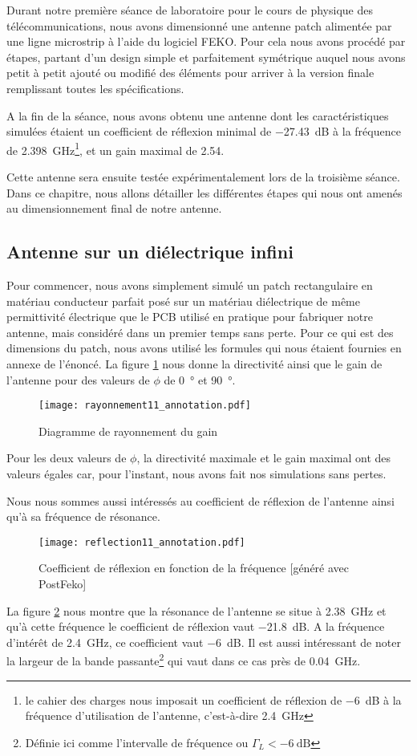 Durant notre première séance de laboratoire pour le cours de physique des télécommunications, nous avons dimensionné une antenne patch alimentée par une ligne microstrip à l'aide du logiciel FEKO. Pour cela nous avons procédé par étapes, partant d'un design simple et parfaitement symétrique auquel nous avons petit à petit ajouté ou modifié des éléments pour arriver à la version finale remplissant toutes les spécifications.

A la fin de la séance, nous avons obtenu une antenne dont les caractéristiques simulées étaient un coefficient de réflexion minimal de \SI{-27.43}{\deci\bel} à la fréquence de \SI{2.398}{\giga\hertz}\footnote{le cahier des charges nous imposait un coefficient de réflexion de \SI{-6}{\deci\bel} à la fréquence d'utilisation de l'antenne, c'est-à-dire \SI{2.4}{\giga\hertz}}, et un gain maximal de \num{2.54}.

Cette antenne sera ensuite testée expérimentalement lors de la troisième séance. Dans ce chapitre, nous allons détailler les différentes étapes qui nous ont amenés au dimensionnement final de notre antenne.

\subsection{Antenne sur un diélectrique infini}
Pour commencer, nous avons simplement simulé un patch rectangulaire en matériau conducteur parfait posé sur un matériau diélectrique de même permittivité électrique que le PCB utilisé en pratique pour fabriquer notre antenne, mais considéré dans un premier temps sans perte. Pour ce qui est des dimensions du patch, nous avons utilisé les formules qui nous étaient fournies en annexe de l'énoncé. La figure \ref{fig:rayonnement_11} nous donne la directivité ainsi que le gain de l'antenne pour des valeurs de $\phi$ de \SI{0}{\degree} et \SI{90}{\degree}.
\begin{figure}[htbp]
  \centering
  \texttt{[image: rayonnement11\_annotation.pdf]}
  \caption{Diagramme de rayonnement du gain \label{fig:rayonnement_11}}
\end{figure}
Pour les deux valeurs de $\phi$, la directivité maximale et le gain maximal ont des valeurs égales car, pour l'instant, nous avons fait nos simulations sans pertes. 

Nous nous sommes aussi intéressés au coefficient de réflexion de l'antenne ainsi qu'à sa fréquence de résonance.
\begin{figure}[htbp]
  \centering
  \texttt{[image: reflection11\_annotation.pdf]}
  \caption{Coefficient de réflexion en fonction de la fréquence [généré avec PostFeko]\label{fig:reflection11_}}
\end{figure}
La figure \ref{fig:reflection11_} nous montre que la résonance de l'antenne se situe à \SI{2.38}{\giga\hertz} et qu'à cette fréquence le coefficient de réflexion vaut \SI{-21.8}{\deci\bel}. A la fréquence d'intérêt de \SI{2.4}{\giga\hertz}, ce coefficient vaut \SI{-6}{\deci\bel}. Il est aussi intéressant de noter la largeur de la bande passante\footnote{Définie ici comme l'intervalle de fréquence ou $\Gamma_L < \SI{-6}{\deci\bel}$} qui vaut dans ce cas près de \SI{0.04}{\giga\hertz}.

